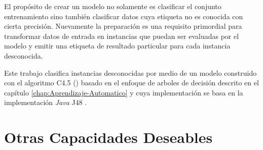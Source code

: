 El propósito de crear un modelo no solamente es clasificar el conjunto
entrenamiento sino también clasificar datos cuya etiqueta no es conocida
con cierta precisión. Nuevamente la preparación es una requisito primordial
para transformar datos de entrada en instancias que puedan ser evaluadas
por el modelo y emitir una etiqueta de resultado particular para cada
instancia desconocida.

Este trabajo clasifica instancias desconocidas por medio de un modelo
construido con el algoritmo C4.5 () basado en el
enfoque de arboles de decisión descrito en el capítulo \ref{chap:Aprendizaje-Automatico}
y cuya implementación se basa en la implementación \emph{Java} J48
\cite{Frank2016b}.

\section{Otras Capacidades Deseables}

